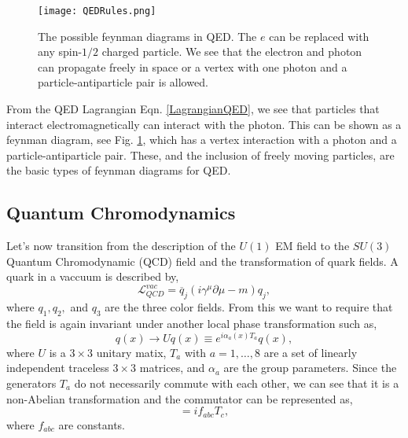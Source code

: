 \begin{figure}
 	\centering
	\texttt{[image: QEDRules.png]}
 	\caption[QED Feynman Diagrams]{The possible feynman diagrams in QED. The $e$ can be replaced with any spin-$1/2$ charged particle. We see that the electron and photon can propagate freely in space or a vertex with one photon and a particle-antiparticle pair is allowed.}
 	\label{QEDRules} 
\end{figure}

From the QED Lagrangian Eqn. \ref{LagrangianQED}, we see that particles that interact electromagnetically can interact with the photon. This can be shown as a feynman diagram, see Fig. \ref{QEDRules}, which has a vertex interaction with a photon and a particle-antiparticle pair. These, and the inclusion of freely moving particles, are the basic types of feynman diagrams for QED. 

\subsection{Quantum Chromodynamics}

Let's now transition from the description of the $U(1)$ EM field to the $SU(3)$ Quantum Chromodynamic (QCD) field and the transformation of quark fields. A quark in a vaccuum is described by,
\begin{equation}\label{LagrangianQCDVacuum}
\mathcal{L}_{QCD}^{vac}=\overline{q}_j(i\gamma^\mu\partial\mu-m)q_j,
\end{equation}
where $q_1, q_2,$ and $q_3$ are the three color fields. From this we want to require that the field is again invariant under another local phase transformation such as,
\begin{equation}
q(x)\rightarrow Uq(x)\equiv e^{i\alpha_a(x)T_a}q(x),
\end{equation}
where $U$ is a $3\times3$ unitary matix, $T_a$ with $a=1,\ldots,8$ are a set of linearly independent traceless $3\times3$ matrices, and $\alpha_a$ are the group parameters. Since the generators $T_a$ do not necessarily commute with each other, we can see that it is a non-Abelian transformation and the commutator can be represented as,
\begin{equation}
[T_a, T_b]=if_{abc}T_c,
\end{equation}
where $f_{abc}$ are constants. 


